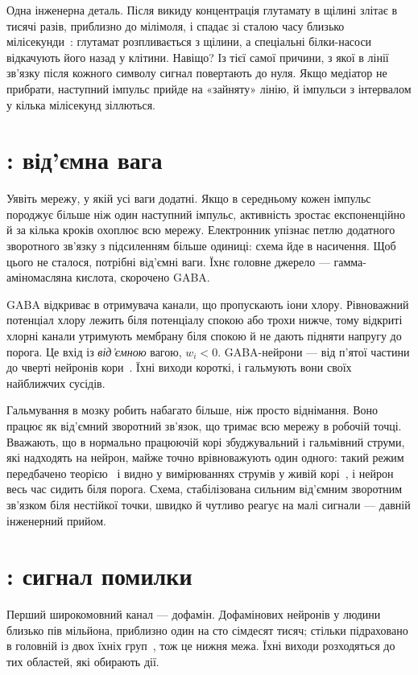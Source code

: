 Одна інженерна деталь. Після викиду концентрація глутамату в щілині злітає в тисячі разів, приблизно до мілімоля, і спадає зі сталою часу близько мілісекунди~\cite{Clements1992}: глутамат розпливається з щілини, а спеціальні білки-насоси відкачують його назад у клітини. Навіщо? Із тієї самої причини, з якої в лінії зв'язку після кожного символу сигнал повертають до нуля. Якщо медіатор не прибрати, наступний імпульс прийде на «зайняту» лінію, й імпульси з інтервалом у кілька мілісекунд зіллються.

\section{: від'ємна вага}

Уявіть мережу, у якій усі ваги додатні. Якщо в середньому кожен імпульс породжує більше ніж один наступний імпульс, активність зростає експоненційно й за кілька кроків охоплює всю мережу. Електронник упізнає петлю додатного зворотного зв'язку з підсиленням більше одиниці: схема йде в насичення. Щоб цього не сталося, потрібні від'ємні ваги. Їхнє головне джерело --- гамма-аміномасляна кислота, скорочено GABA.

GABA відкриває в отримувача канали, що пропускають іони хлору. Рівноважний потенціал хлору лежить біля потенціалу спокою або трохи нижче, тому відкриті хлорні канали утримують мембрану біля спокою й не дають підняти напругу до порога. Це вхід із \emph{від'ємною} вагою, $w_i<0$. GABA-нейрони --- від п'ятої частини до чверті нейронів кори~\cite{Hendry1987}. Їхні виходи короткі, і гальмують вони своїх найближчих сусідів.

Гальмування в мозку робить набагато більше, ніж просто віднімання. Воно працює як від'ємний зворотний зв'язок, що тримає всю мережу в робочій точці. Вважають, що в нормально працюючій корі збуджувальний і гальмівний струми, які надходять на нейрон, майже точно врівноважують один одного: такий режим передбачено теорією~\cite{vanVreeswijk1996} і видно у вимірюваннях струмів у живій корі~\cite{Haider2006}, і нейрон весь час сидить біля порога. Схема, стабілізована сильним від'ємним зворотним зв'язком біля нестійкої точки, швидко й чутливо реагує на малі сигнали --- давній інженерний прийом.

\section{: сигнал помилки}

Перший широкомовний канал --- дофамін. Дофамінових нейронів у людини близько пів мільйона, приблизно один на сто сімдесят тисяч; стільки підраховано в головній із двох їхніх груп~\cite{Pakkenberg1991}, тож це нижня межа. Їхні виходи розходяться до тих областей, які обирають дії.

